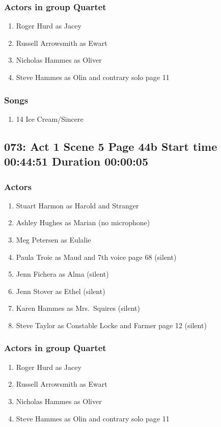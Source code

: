 \subsubsection{Actors in group Quartet}
\begin{enumerate}
\item Roger Hurd as Jacey
\item Russell Arrowsmith as Ewart
\item Nicholas Hammes as Oliver
\item Steve Hammes as Olin and contrary solo page 11
\end{enumerate}

\subsubsection{Songs}
\begin{enumerate}
\item 14 Ice Cream/Sincere
\end{enumerate}
\subsection{073: Act 1 Scene 5 Page 44b Start time 00:44:51 Duration 00:00:05}

\subsubsection{Actors}
\begin{enumerate}
\item Stuart Harmon as Harold and Stranger
\item Ashley Hughes as Marian (no microphone)
\item Meg Petersen as Eulalie
\item Paula Troie as Maud and 7th voice page 68 (silent)
\item Jenn Fichera as Alma (silent)
\item Jenn Stover as Ethel (silent)
\item Karen Hammes as Mrs.~Squires (silent)
\item Steve Taylor as Constable Locke and Farmer page 12 (silent)
\end{enumerate}
\subsubsection{Actors in group Quartet}
\begin{enumerate}
\item Roger Hurd as Jacey
\item Russell Arrowsmith as Ewart
\item Nicholas Hammes as Oliver
\item Steve Hammes as Olin and contrary solo page 11
\end{enumerate}

